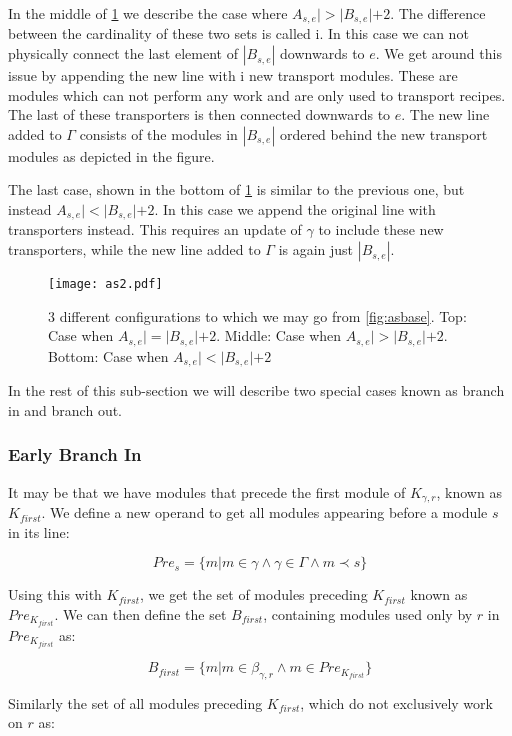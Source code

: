 In the middle of \cref{fig:astrans} we describe the case where $A_{s,e}| > |B_{s,e}| + 2$. The difference between the cardinality of these two sets is called i.  In this case we can not physically connect the last element of $|B_{s,e}|$ downwards to $e$. We get around this issue by appending the new line with i new transport modules. These are modules which can not perform any work and are only used to transport recipes. The last of these transporters is then connected downwards to $e$. The new line added to $\Gamma$ consists of the modules in $|B_{s,e}|$ ordered behind the new transport modules as depicted in the figure. 

The last case, shown in the bottom of \cref{fig:astrans} is similar to the previous one, but instead $A_{s,e}| < |B_{s,e}| + 2$. In this case we append the original line with transporters instead. This requires an update of $\gamma$ to include these new transporters, while the new line added to $\Gamma$ is again just $|B_{s,e}|$. 

\begin{figure}[h]
\centering
\texttt{[image: as2.pdf]}
\caption{3 different configurations to which we may go from \cref{fig:asbase}. Top: Case when $A_{s,e}| = |B_{s,e}| + 2$. Middle: Case when $A_{s,e}| > |B_{s,e}| + 2$. Bottom: Case when $A_{s,e}| < |B_{s,e}| + 2$ }
\label{fig:astrans}
\end{figure}

In the rest of this sub-section we will describe two special cases known as branch in and branch out. 

\subsubsection{Early Branch In}\label{sssec:bi}
It may be that we have modules that precede the first module of $K_{\gamma ,r}$, known as $K_{first}$. We define a new operand to get all modules appearing before a module $s$ in its line:

\[Pre_{s} = \{m | m \in \gamma \land \gamma \in \Gamma \land m \prec s\}\]

Using this with $K_{first}$, we get the set of modules preceding $K_{first}$ known as $Pre_{K_{first}}$. We can then define the set $B_{first}$, containing modules used only by $r$ in $Pre_{K_{first}}$ as:

\[ B_{first} = \{m | m \in \beta_{\gamma ,r}  \land m \in Pre_{K_{first}} \} \]

Similarly the set of all modules preceding $K_{first}$, which do not exclusively work on $r$ as: 


